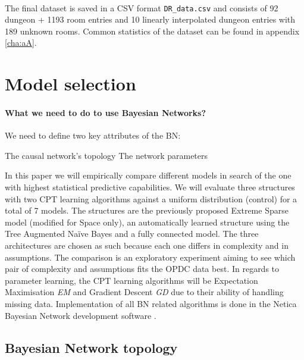 \documentclass{UoYCSproject}
\begin{document}
\paragraph{}
The final dataset is saved in a CSV format \texttt{DR\_data.csv} and consists of 92 dungeon + 1193 room entries and 10 linearly interpolated dungeon entries with 189 unknown rooms. Common statistics of the dataset can be found in appendix \ref{cha:aA}.

\section{Model selection} %
\label{sec:model_selection}

\paragraph{What we need to do to use Bayesian Networks?}
We need to define two key attributes of the BN:
\begin{outline}[enumerate]
  \1 The causal network's topology
  \1 The network parameters
\end{outline}
In this paper we will empirically compare different models in search of the one with highest statistical predictive capabilities. We will evaluate three structures with two CPT learning algorithms against a uniform distribution (control) for a total of 7 models. The structures are the previously proposed Extreme Sparse model \parencite{SummervilleSamplingHyrule} (modified for Space only), an automatically learned structure using the Tree Augmented Na\"{i}ve Bayes and a fully connected model. The three architectures are chosen as such because each one differs in complexity and in assumptions. The comparison is an exploratory experiment aiming to see which pair of complexity and assumptions fits the OPDC data best. In regards to parameter learning, the CPT learning algorithms will be Expectation Maximisation \textit{EM} and Gradient Descent \textit{GD} due to their ability of handling missing data. Implementation of all BN related algorithms is done in the Netica Bayesian Network development software \parencite{netica}.

\subsection{Bayesian Network topology}
\end{document}
